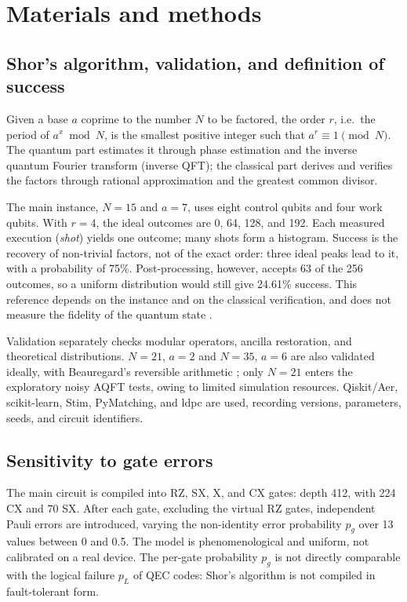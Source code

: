 \section{Materials and methods}

\subsection{Shor's algorithm, validation, and definition of success}\label{sec:implementation-en}

Given a base \(a\) coprime to the number \(N\) to be factored, the order \(r\), i.e.\ the
period of \(a^{x} \bmod N\), is the smallest positive integer such that
\(a^{r} \equiv 1 \pmod{N}\). The quantum part estimates it through phase estimation and the
inverse quantum Fourier transform (inverse QFT); the classical part derives and verifies
the factors through rational approximation and the greatest common divisor.

The main instance, \(N = 15\) and \(a = 7\), uses eight control qubits and four work
qubits. With \(r = 4\), the ideal outcomes are 0, 64, 128, and 192. Each measured execution
(\emph{shot}) yields one outcome; many shots form a histogram. Success is the recovery of
non-trivial factors, not of the exact order: three ideal peaks lead to it, with a
probability of 75\%. Post-processing, however, accepts 63 of the 256 outcomes, so a uniform
distribution would still give 24.61\% success. This reference depends on the instance and
on the classical verification, and does not measure the fidelity of the quantum state
\cite{en-smolin2013}.

Validation separately checks modular operators, ancilla restoration, and theoretical
distributions. \(N = 21\), \(a = 2\) and \(N = 35\), \(a = 6\) are also validated ideally,
with Beauregard's reversible arithmetic \cite{en-beauregard2002}; only \(N = 21\) enters the
exploratory noisy AQFT tests, owing to limited simulation resources. Qiskit/Aer,
scikit-learn, Stim, PyMatching, and ldpc are used, recording versions, parameters, seeds,
and circuit identifiers.

\subsection{Sensitivity to gate errors}

The main circuit is compiled into RZ, SX, X, and CX gates: depth 412, with 224 CX and 70
SX. After each gate, excluding the virtual RZ gates, independent Pauli errors are
introduced, varying the non-identity error probability \(p_g\) over 13 values between 0 and
0.5. The model is phenomenological and uniform, not calibrated on a real device. The
per-gate probability \(p_g\) is not directly comparable with the logical failure \(p_L\) of
QEC codes: Shor's algorithm is not compiled in fault-tolerant form.

